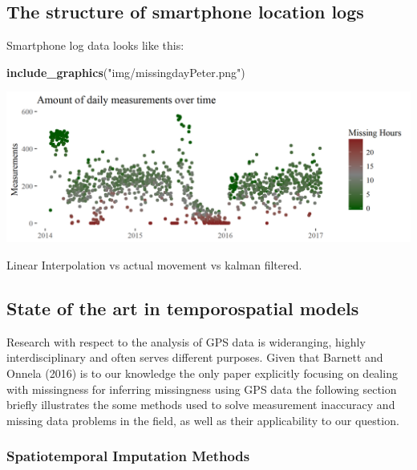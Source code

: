 \documentclass[]{article}
\newenvironment{Shaded}{\begin{snugshade}}{\end{snugshade}}
\newcommand{\KeywordTok}[1]{\textcolor[rgb]{0.13,0.29,0.53}{\textbf{#1}}}
\newcommand{\StringTok}[1]{\textcolor[rgb]{0.31,0.60,0.02}{#1}}
\newcommand{\NormalTok}[1]{#1}
\let\origfigure\figure
\let\endorigfigure\endfigure
\renewenvironment{figure}[1][2] {
    \expandafter\origfigure\expandafter[H]
} {
    \endorigfigure
}
\begin{document}
\subsection{The structure of smartphone location
logs}\label{the-structure-of-smartphone-location-logs}

Smartphone log data looks like this:

\begin{Shaded}
\begin{Highlighting}[]
\KeywordTok{include_graphics}\NormalTok{(}\StringTok{"img/missingdayPeter.png"}\NormalTok{)}
\end{Highlighting}
\end{Shaded}

\begin{figure}
\includegraphics[width=36.28in]{img/missingdayPeter} \caption{Missing data caption.}\label{fig:measurementsPerDay}
\end{figure}

Linear Interpolation vs actual movement vs kalman filtered.

\subsection{State of the art in temporospatial
models}\label{state-of-the-art-in-temporospatial-models}

Research with respect to the analysis of GPS data is wideranging, highly
interdisciplinary and often serves different purposes. Given that
Barnett and Onnela (2016) is to our knowledge the only paper explicitly
focusing on dealing with missingness for inferring missingness using GPS
data the following section briefly illustrates the some methods used to
solve measurement inaccuracy and missing data problems in the field, as
well as their applicability to our question.

\subsubsection{Spatiotemporal Imputation
Methods}\label{spatiotemporal-imputation-methods}
\end{document}
